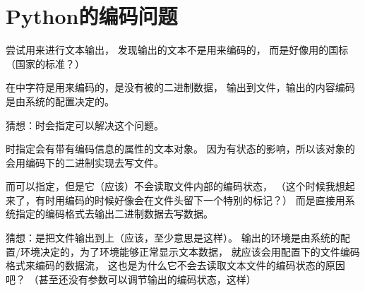 \section{Python的编码问题}

尝试用来进行文本输出，
发现输出的文本不是用来编码的，
而是好像用的国标（国家的标准？）

在中字符是用来编码的，是没有被的二进制数据，
输出到文件，输出的内容编码是由系统的配置决定的。

猜想：时会指定可以解决这个问题。

时指定会有带有编码信息的属性的文本对象。
因为有状态的影响，所以该对象的会用编码下的二进制实现去写文件。

而可以指定，但是它（应该）不会读取文件内部的编码状态，
（这个时候我想起来了，有时用编码的时候好像会在文件头留下一个特别的标记？）
而是直接用系统指定的编码格式去输出二进制数据去写数据。

猜想：是把文件输出到上（应该，至少意思是这样）。
输出的环境是由系统的配置/环境决定的，为了环境能够正常显示文本数据，
就应该会用配置下的文件编码格式来编码的数据流，
这也是为什么它不会去读取文本文件的编码状态的原因吧？
（甚至还没有参数可以调节输出的编码状态，这样）
